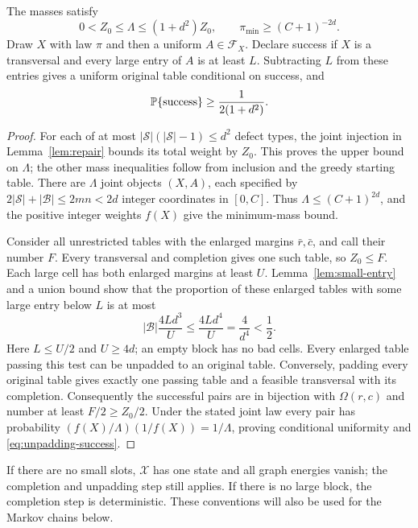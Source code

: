 \begin{proposition}\label{prop:stationary-success}
The masses satisfy
\begin{equation}\label{eq:stationary-mass-bounds}
 0<Z_0\le\Lambda\le(1+d^2)Z_0,
 \qquad \pi_{\min}\ge(C+1)^{-2d}.
\end{equation}
Draw $X$ with law $\pi$ and then a uniform $A\in\mathcal F_X$.
Declare success if $X$ is a transversal and every large entry of $A$
is at least $L$.  Subtracting $L$ from these entries gives a uniform
original table conditional on success, and
\begin{equation}\label{eq:unpadding-success}
 \mathbb{P}\{\text{success}\}\ge\frac{1}{2(1+d^2)}.
\end{equation}
\end{proposition}
\begin{proof}
For each of at most $|\mathcal S|(|\mathcal S|-1)\le d^2$ defect types,
the joint injection in Lemma~\ref{lem:repair} bounds its total weight
by $Z_0$.  This proves the upper bound on $\Lambda$; the other mass
inequalities follow from inclusion and the greedy starting table.
There are $\Lambda$ joint objects $(X,A)$, each specified by
$2|\mathcal S|+|\mathcal B|\le2mn<2d$ integer coordinates in $[0,C]$.
Thus $\Lambda\le(C+1)^{2d}$, and the positive integer weights $f(X)$
give the minimum-mass bound.

Consider all unrestricted tables with the enlarged margins
$\bar r,\bar c$, and call their number $F$.  Every transversal and
completion gives one such table, so $Z_0\le F$.
Each large cell has both enlarged margins at least $U$.
Lemma~\ref{lem:small-entry} and a union bound show that the proportion
of these enlarged tables with some large entry below $L$ is at most
\[
 |\mathcal B|\frac{4Ld^3}{U}\le\frac{4Ld^4}{U}
 =\frac4{d^4}<\frac12.
\]
Here $L\le U/2$ and $U\ge4d$; an empty block has no bad cells.
Every enlarged table passing this test can be unpadded to an original
table.  Conversely, padding every original table gives exactly one
passing table and a feasible transversal with its completion.
Consequently the successful pairs are in bijection with
$\Omega(r,c)$ and number at least $F/2\ge Z_0/2$.
Under the stated joint law every pair has probability
$(f(X)/\Lambda)(1/f(X))=1/\Lambda$, proving conditional uniformity
and \eqref{eq:unpadding-success}.
\end{proof}

If there are no small slots, $\mathcal X$ has one state and all graph
energies vanish; the completion and unpadding step still applies.
If there is no large block, the completion step is deterministic.
These conventions will also be used for the Markov chains below.
